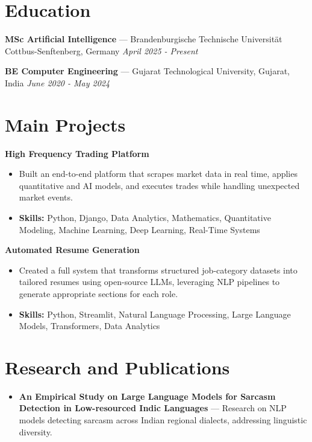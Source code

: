 \documentclass[a4paper,10pt]{article}
\begin{document}
\section*{Education}
\textbf{MSc Artificial Intelligence} — Brandenburgische Technische Universität Cottbus-Senftenberg, Germany \hfill \textit{April 2025 - Present}\par
\vspace{1.5pt}
\textbf{BE Computer Engineering} — Gujarat Technological University, Gujarat, India \hfill \textit{June 2020 - May 2024}\par

\section*{Main Projects}
\textbf{High Frequency Trading Platform}\par
\vspace{1pt}
\begin{itemize}
  \item Built an end-to-end platform that scrapes market data in real time, applies quantitative and AI models, and executes trades while handling unexpected market events.
  \item \textbf{Skills:} Python, Django, Data Analytics, Mathematics, Quantitative Modeling, Machine Learning, Deep Learning, Real-Time Systems
\end{itemize}
\vspace{3pt}
\textbf{Automated Resume Generation}\par
\vspace{1pt}
\begin{itemize}
  \item Created a full system that transforms structured job-category datasets into tailored resumes using open-source LLMs, leveraging NLP pipelines to generate appropriate sections for each role.
  \item \textbf{Skills:} Python, Streamlit, Natural Language Processing, Large Language Models, Transformers, Data Analytics
\end{itemize}

\section*{Research and Publications}
\begin{itemize}
\item \textbf{An Empirical Study on Large Language Models for Sarcasm Detection in Low-resourced Indic Languages} — Research on NLP models detecting sarcasm across Indian regional dialects, addressing linguistic diversity.
\end{itemize}
\end{document}
